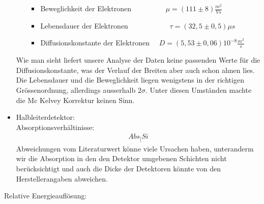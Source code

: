 \documentclass[12pt]{article}
\begin{document}
\begin{itemize}
\begin{itemize}
\begin{itemize}
 \item Beweglichkeit der Elektronen ~~~~~~~~~$\mu = (111 \pm 8) \frac{m^2}{Vs}$ 
 \item Lebensdauer der Elektronen ~~~~~~~~~~~$\tau = (32,5 \pm 0,5) \mu s $
 \item Diffusionskonstante der Elektronen ~~$D = (5,53 \pm 0,06) 10^{-8} \frac{m^2}{s}$
\end{itemize}
\end{itemize}
Wie man sieht liefert unsere Analyse der Daten keine passenden Werte für die Diffusionskonstante, was der Verlauf der Breiten aber auch schon ahnen lies. Die Lebensdauer und die Beweglichkeit liegen wenigstens in der richtigen Grössenordnung, allerdings ausserhalb $2\sigma$. Unter diesen Umständen machte die Mc Kelvey Korrektur keinen Sinn.


\item Halbleiterdetektor: \\

Absorptionsverhältinisse: 
\begin{align*}
 Abs_[Si
\end{align*}
Abweichungen vom Literaturwert könne viele Ursachen haben, unteranderm wir die Absorption in den den Detektor umgebenen Schichten nicht berücksichtigt und auch die Dicke der Detektoren könnte von den Herstellerangaben abweichen.\\
\end{itemize}
Relative Energieauflösung:
\end{document}
